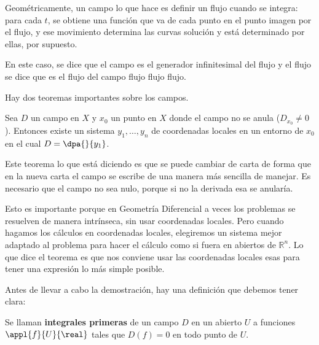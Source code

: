 Geométricamente, un campo lo que hace es definir un flujo cuando se integra: para cada $t$, se obtiene una función que va de cada punto en el punto imagen por el flujo, y ese movimiento determina las curvas solución y está determinado por ellas, por supuesto.

En este caso, se dice que el campo es el generador infinitesimal del flujo y el flujo se dice que es el flujo del campo flujo flujo flujo.

Hay dos teoremas importantes sobre los campos.

\begin{theorem} Sea $D$ un campo en $X$ y $x_0$ un punto en $X$ donde el campo no se anula ($D_{x_0} ≠ 0$). Entonces existe un sistema $y_1, \dotsc, y_n$ de coordenadas locales en un entorno de $x_0$ en el cual $D = \dpa{}{y_1}$. \label{thmEnderezamientoCampos}
\end{theorem}

Este teorema lo que está diciendo es que se puede cambiar de carta de forma que en la nueva carta el campo se escribe de una manera más sencilla de manejar. Es necesario que el campo no sea nulo, porque si no la derivada esa se anularía.

Esto es importante porque en Geometría Diferencial a veces los problemas se resuelven de manera intrínseca, sin usar coordenadas locales. Pero cuando hagamos los cálculos en coordenadas locales, elegiremos un sistema mejor adaptado al problema para hacer el cálculo como si fuera en abiertos de $ℝ^n$. Lo que dice el teorema es que nos conviene usar las coordenadas locales esas para tener una expresión lo más simple posible.

Antes de llevar a cabo la demostración, hay una definición que debemos tener clara:

\begin{defn} Se llaman \textbf{integrales primeras} de un campo $D$ en un abierto $U$ a funciones $\appl{f}{U}{\real}$ tales que $D(f)=0$ en todo punto de $U$.
\end{defn}

